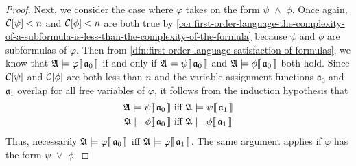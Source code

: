\begin{proof}
    \vspace{0.3cm}
    \noindent
    Next, we consider the case where \( \varphi \) takes on the form \( \psi \,\,{\land}\,\, \phi \).
    Once again, \( \folcomplexityofformula{\psi} < n \) and \( \folcomplexityofformula{\phi} < n \) are both true
    by \cref{cor:first-order-language-the-complexity-of-a-subformula-is-less-than-the-complexity-of-the-formula}
    because \( \psi \) and \( \phi \) are subformulas of \( \varphi \).
    Then from \cref{dfn:first-order-language-satisfaction-of-formulas}, we know that \(  \mathfrak{A} \models \varphi\llbracket\, \mathfrak{a}_{0} \,\rrbracket \)
    if and only if \(  \mathfrak{A} \models \psi\llbracket\, \mathfrak{a}_{0} \,\rrbracket \) and \(  \mathfrak{A} \models \phi\llbracket\, \mathfrak{a}_{0} \,\rrbracket \) both hold.
    Since \( \folcomplexityofformula{\psi} \) and \( \folcomplexityofformula{\phi} \) are both less than \( n \) and the variable assignment functions
    \( \mathfrak{a}_{0} \) and \( \mathfrak{a}_{1} \) overlap for all free variables of \( \varphi \), it follows from the induction hypothesis that
    \begin{align*}
         \mathfrak{A} \models \psi\llbracket\, \mathfrak{a}_{0} \,\rrbracket &\text{ iff }  \mathfrak{A} \models \psi\llbracket\, \mathfrak{a}_{1} \,\rrbracket\\
         \mathfrak{A} \models \phi\llbracket\, \mathfrak{a}_{0} \,\rrbracket &\text{ iff }  \mathfrak{A} \models \phi\llbracket\, \mathfrak{a}_{1} \,\rrbracket
    \end{align*}
    Thus, necessarily \(  \mathfrak{A} \models \varphi\llbracket\, \mathfrak{a}_{0} \,\rrbracket \) iff \(  \mathfrak{A} \models \varphi\llbracket\, \mathfrak{a}_{1} \,\rrbracket \).
    The same argument applies if \( \varphi \) has the form \( \psi \,\,{\lor}\,\, \phi \).


\end{proof}
